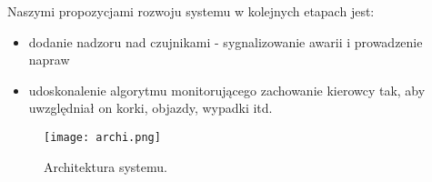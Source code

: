 {\color{teal} Naszymi propozycjami rozwoju systemu w kolejnych etapach jest:
\begin{itemize}
\item dodanie nadzoru nad czujnikami - sygnalizowanie awarii i prowadzenie napraw
\item udoskonalenie algorytmu monitorującego zachowanie kierowcy tak, aby uwzględniał on korki, objazdy, wypadki itd.
\end{itemize}
}

\begin{figure}[H]
    \label{fig:architektura}
    \centering \texttt{[image: archi.png]}
    \caption{Architektura systemu.}
\end{figure}